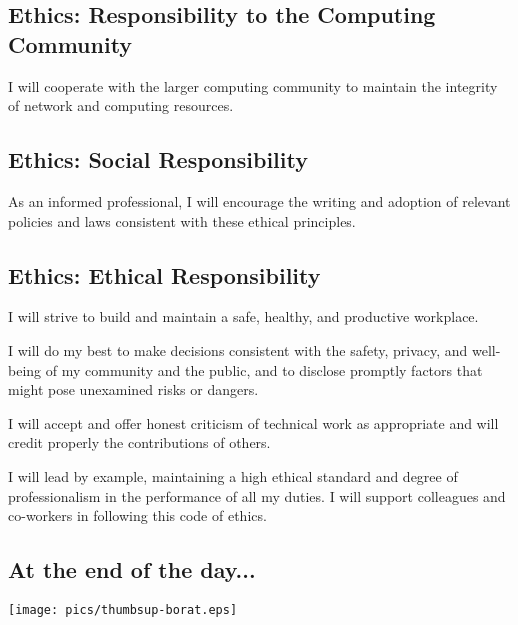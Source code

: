 \documentclass[xga]{xdvislides}
\begin{document}
\subsection{Ethics: Responsibility to the Computing Community}
\vfill
\begin{center}
I will cooperate with the larger computing community to maintain the
integrity of network and computing resources.
\end{center}
\vfill

\subsection{Ethics: Social Responsibility}
\vfill
\begin{center}
As an informed professional, I will encourage the writing and adoption of
relevant policies and laws consistent with these ethical principles.
\end{center}
\vfill

\subsection{Ethics: Ethical Responsibility}
\vfill
\begin{center}
I will strive to build and maintain a safe, healthy, and productive
workplace. \\
\vspace{.5in}

I will do my best to make decisions consistent with the safety, privacy,
and well-being of my community and the public, and to disclose promptly
factors that might pose unexamined risks or dangers. \\
\vspace{.5in}

I will accept and offer honest criticism of technical work as appropriate
and will credit properly the contributions of others. \\
\vspace{.5in}

I will lead by example, maintaining a high ethical standard and degree
of professionalism in the performance of all my duties. I will support
colleagues and co-workers in following this code of ethics.

\end{center}
\vfill

\subsection{At the end of the day...}
\begin{center}
	\texttt{[image: pics/thumbsup-borat.eps]}
\end{center}
\end{document}
